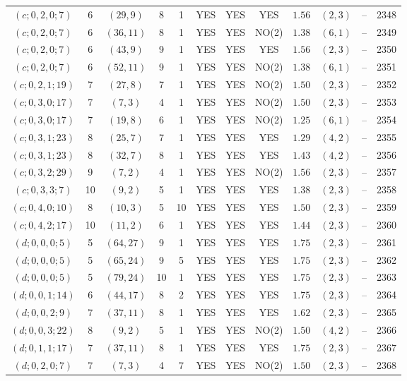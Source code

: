 \begin{longtable}{|c|c|c|c|c|c|c|c|c|c|c|c|}
$(c;0,2,0;7)$ & 6 & $(29,9)$ & 8 & 1 & YES & YES & YES & $1.56$ & $(2,3)$ & -- & 2348\\
$(c;0,2,0;7)$ & 6 & $(36,11)$ & 8 & 1 & YES & YES & NO(2) & $1.38$ & $(6,1)$ & -- & 2349\\
$(c;0,2,0;7)$ & 6 & $(43,9)$ & 9 & 1 & YES & YES & YES & $1.56$ & $(2,3)$ & -- & 2350\\
$(c;0,2,0;7)$ & 6 & $(52,11)$ & 9 & 1 & YES & YES & NO(2) & $1.38$ & $(6,1)$ & -- & 2351\\
$(c;0,2,1;19)$ & 7 & $(27,8)$ & 7 & 1 & YES & YES & NO(2) & $1.50$ & $(2,3)$ & -- & 2352\\
$(c;0,3,0;17)$ & 7 & $(7,3)$ & 4 & 1 & YES & YES & NO(2) & $1.50$ & $(2,3)$ & -- & 2353\\
$(c;0,3,0;17)$ & 7 & $(19,8)$ & 6 & 1 & YES & YES & NO(2) & $1.25$ & $(6,1)$ & -- & 2354\\
$(c;0,3,1;23)$ & 8 & $(25,7)$ & 7 & 1 & YES & YES & YES & $1.29$ & $(4,2)$ & -- & 2355\\
$(c;0,3,1;23)$ & 8 & $(32,7)$ & 8 & 1 & YES & YES & YES & $1.43$ & $(4,2)$ & -- & 2356\\
$(c;0,3,2;29)$ & 9 & $(7,2)$ & 4 & 1 & YES & YES & NO(2) & $1.56$ & $(2,3)$ & -- & 2357\\
$(c;0,3,3;7)$ & 10 & $(9,2)$ & 5 & 1 & YES & YES & YES & $1.38$ & $(2,3)$ & -- & 2358\\
$(c;0,4,0;10)$ & 8 & $(10,3)$ & 5 & 10 & YES & YES & YES & $1.50$ & $(2,3)$ & -- & 2359\\
$(c;0,4,2;17)$ & 10 & $(11,2)$ & 6 & 1 & YES & YES & YES & $1.44$ & $(2,3)$ & -- & 2360\\
$(d;0,0,0;5)$ & 5 & $(64,27)$ & 9 & 1 & YES & YES & YES & $1.75$ & $(2,3)$ & -- & 2361\\
$(d;0,0,0;5)$ & 5 & $(65,24)$ & 9 & 5 & YES & YES & YES & $1.75$ & $(2,3)$ & -- & 2362\\
$(d;0,0,0;5)$ & 5 & $(79,24)$ & 10 & 1 & YES & YES & YES & $1.75$ & $(2,3)$ & -- & 2363\\
$(d;0,0,1;14)$ & 6 & $(44,17)$ & 8 & 2 & YES & YES & YES & $1.75$ & $(2,3)$ & -- & 2364\\
$(d;0,0,2;9)$ & 7 & $(37,11)$ & 8 & 1 & YES & YES & YES & $1.62$ & $(2,3)$ & -- & 2365\\
$(d;0,0,3;22)$ & 8 & $(9,2)$ & 5 & 1 & YES & YES & NO(2) & $1.50$ & $(4,2)$ & -- & 2366\\
$(d;0,1,1;17)$ & 7 & $(37,11)$ & 8 & 1 & YES & YES & YES & $1.75$ & $(2,3)$ & -- & 2367\\
$(d;0,2,0;7)$ & 7 & $(7,3)$ & 4 & 7 & YES & YES & NO(2) & $1.50$ & $(2,3)$ & -- & 2368\\

\end{longtable}
